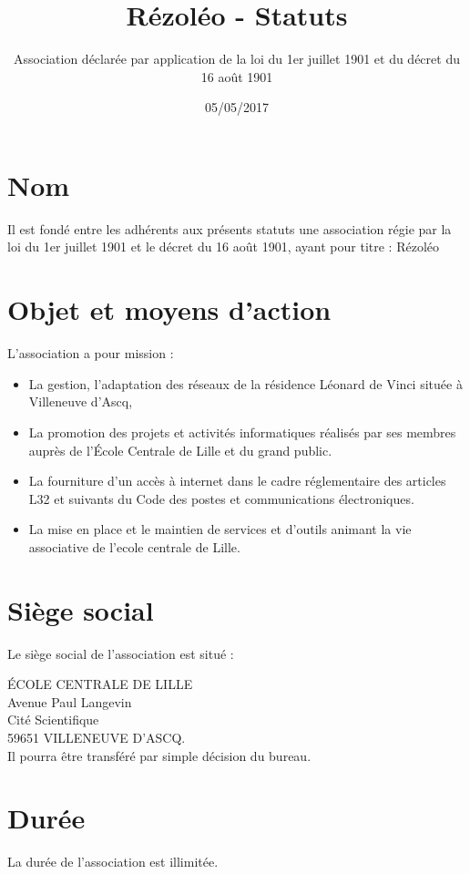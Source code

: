 \documentclass[12pt]{constitution}
\begin{document}
	\title{Rézoléo - Statuts}
	\author{Association déclarée par application de la loi du 1er juillet 1901 et du décret du 16 août 1901}
	\date{05/05/2017}
	\maketitle
	\newpage
	
	\section{Nom}
Il est fondé entre les adhérents aux présents statuts une association régie par la loi du 1er juillet 1901 et le décret du 16 août 1901, ayant pour titre : Rézoléo
	
	\section{Objet et moyens d'action}
	L’association a pour mission :
	\begin{itemize}
		\item[\textbullet] La gestion, l'adaptation des réseaux de la résidence Léonard de Vinci située à Villeneuve d'Ascq,
		\item[\textbullet]La promotion des projets et activités informatiques réalisés par ses membres auprès de l’École Centrale de Lille et du grand public.
		\item[\textbullet] La fourniture d'un accès à internet dans le cadre réglementaire des articles L32 et suivants du Code des postes et communications électroniques.
		\item[\textbullet] La mise en place et le maintien de services et d'outils animant la vie associative de l'ecole centrale de Lille.
	\end{itemize}
	
	\section{Siège social}
	Le siège social de l'association est situé :
	
	ÉCOLE CENTRALE DE LILLE \\
	Avenue Paul Langevin \\
	Cité Scientifique \\
	59651 VILLENEUVE D’ASCQ. \\
	Il pourra être transféré par simple décision du bureau.
	
	\section{Durée}
	La durée de l’association est illimitée.
	
\end{document}
